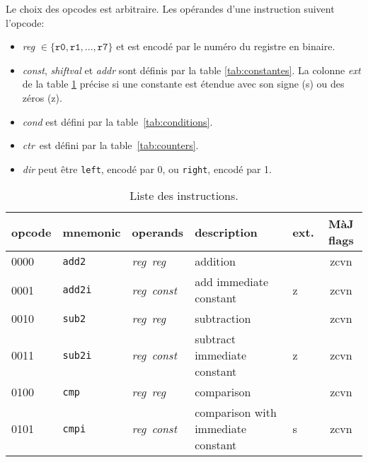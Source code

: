 \documentclass[architecture]{compas2018}
\newcommand{\reg}{\textit{reg}}
\newcommand{\const}{\textit{const}}
\newcommand{\ctr}{\textit{ctr}}
\begin{document}
\appendix
\begin{table}[!h]
  \caption{Liste des instructions.}
  \label{tab:opcodes}
  Le choix des opcodes est arbitraire.
  Les opérandes d'une instruction suivent l'opcode:
  \begin{itemize}
\item \textit{reg} $\in \{\mathtt{r0}, \mathtt{r1}, ..., \mathtt{r7}\}$ et est encodé par le numéro du registre en binaire.
\item \textit{const}, \textit{shiftval} et \textit{addr} sont définis par la table \ref{tab:constantes}. La colonne \emph{ext} de la table  \ref{tab:opcodes} précise si une constante est étendue avec son signe (s) ou des zéros (z).   
\item  \textit{cond} est défini par la table~\ref{tab:conditions}.
\item \ctr\ est défini par la table~\ref{tab:counters}.
\item \textit{dir} peut être \texttt{left}, encodé par 0, ou \texttt{right}, encodé par 1.
\end{itemize}
\begin{center}
  \begin{tabular}{|l|l|l|l|l|c|}
    \hline  
    opcode  & mnemonic        & operands                      & description                                          & ext. & {MàJ flags} \\
    \hline  
    \hline  
    0000    & \texttt{add2}   & \reg\ \reg\                   & addition                                             &      & zcvn        \\
    \hline
    0001    & \texttt{add2i}  & \reg\ \const\                 & add immediate constant                               & z    & zcvn        \\
    \hline
    0010    & \texttt{sub2}   & \reg\ \reg\                   & subtraction                                          &      & zcvn        \\
    \hline
    0011    & \texttt{sub2i}  & \reg\ \const\                 & subtract immediate constant                          & z    & zcvn        \\
    \hline
    0100    & \texttt{cmp}    & \reg\ \reg\                   & comparison                                           &      & zcvn        \\
    \hline
    0101    & \texttt{cmpi}   & \reg\ \const\                 & comparison with immediate constant                   & s    & zcvn        \\
    \hline

\end{tabular}
\end{center}
\end{table}
\end{document}
